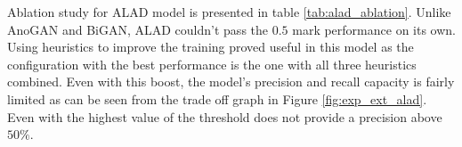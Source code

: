Ablation study for ALAD model is presented in table \ref{tab:alad_ablation}. Unlike AnoGAN 
and BiGAN, ALAD couldn't pass the $0.5$ mark performance on its own. Using heuristics to 
improve the training proved useful in this model as the configuration with the best performance 
is the one with all three heuristics combined. Even with this boost, the model's precision and recall
capacity is fairly limited as can be seen from the trade off graph in Figure \ref{fig:exp_ext_alad}. 
Even with the highest value of the threshold does not provide a precision above $50\%$. 

\begin{table}[!h]
	\centering
	\caption{Ablation study for ALAD to test the effect of various training improvements for stabilization.}
	\label{tab:alad_ablation}
\end{table}

